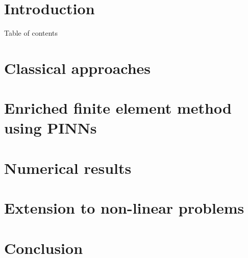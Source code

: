\documentclass[compress,10pt,xcolor={table,dvipsnames},t]{beamer} %
\begin{document}
	\Background
	
	\section*{Introduction}
	

	\begin{frame}{Table of contents}
		\tableofcontents
	\end{frame}

	\section{Classical approaches}
	

	\section[Enriched FEM using PINNs]{Enriched finite element method using PINNs}%
	

	\section{Numerical results}
	

	\section{Extension to non-linear problems}

	

	\section*{Conclusion}
\end{document}
